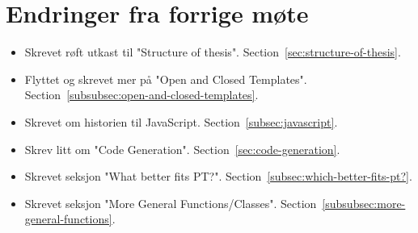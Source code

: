 
\chapter*{Endringer fra forrige møte}

\begin{itemize}
    \item Skrevet røft utkast til "Structure of thesis".
    Section~\vref{sec:structure-of-thesis}.
    \item Flyttet og skrevet mer på "Open and Closed Templates".
    Section~\vref{subsubsec:open-and-closed-templates}.
    \item Skrevet om historien til JavaScript.
    Section~\vref{subsec:javascript}.
    \item Skrev litt om "Code Generation".
    Section~\vref{sec:code-generation}.
    \item Skrevet seksjon "What better fits PT?".
    Section~\vref{subsec:which-better-fits-pt?}.
    \item Skrevet seksjon "More General Functions/Classes".
    Section~\vref{subsubsec:more-general-functions}.
\end{itemize}

